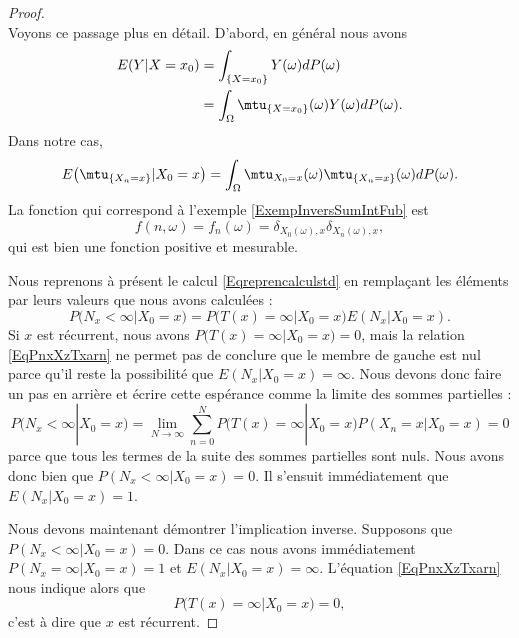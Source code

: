 \begin{proof}
\begin{subequations}
    \end{subequations}
    Voyons ce passage plus en détail. D'abord, en général nous avons
    \begin{subequations}
        \begin{align}
            E(Y|X=x_0)&=\int_{\{ X=x_0 \}}Y(\omega)dP(\omega)\\
            &=\int_{\Omega}\mtu_{\{ X=x_0 \}}(\omega)Y(\omega)dP(\omega).
        \end{align}
    \end{subequations}
    Dans notre cas,
    \begin{equation}
        E\big( \mtu_{\{ X_n=x \}}|X_0=x \big)=\int_{\Omega}\mtu_{X_0=x}(\omega)\mtu_{\{ X_n=x \}}(\omega)dP(\omega).
    \end{equation}
    La fonction qui correspond à l'exemple \ref{ExempInversSumIntFub} est
    \begin{equation}
        f(n,\omega)=f_n(\omega)=\delta_{X_0(\omega),x}\delta_{X_n(\omega),x},
    \end{equation}
    qui est bien une fonction positive et mesurable.

    Nous reprenons à présent le calcul \eqref{Eqreprencalculstd} en remplaçant les éléments par leurs valeurs que nous avons calculées :
    \begin{equation}    \label{EqPnxXzTxarn}
        P(N_x<\infty|X_0=x)=P\big(T(x)=\infty|X_0=x\big)E(N_x|X_0=x).
    \end{equation}
    Si \( x\) est récurrent, nous avons \( P\big( T(x)=\infty|X_0=x \big)=0\), mais la relation \eqref{EqPnxXzTxarn} ne permet pas de conclure que le membre de gauche est nul parce qu'il reste la possibilité que \( E(N_x|X_0=x)=\infty\). Nous devons donc faire un pas en arrière et écrire cette espérance comme la limite des sommes partielles :
    \begin{equation}
        P(N_x<\infty|X_0=x)=\lim_{N\to \infty} \sum_{n=0}^NP\big( T(x)=\infty|X_0=x \big)P(X_n=x|X_0=x)=0
    \end{equation}
    parce que tous les termes de la suite des sommes partielles sont nuls. Nous avons donc bien que \( P(N_x<\infty|X_0=x)=0\). Il s'ensuit immédiatement que \( E(N_x|X_0=x)=1\).

    Nous devons maintenant démontrer l'implication inverse. Supposons que \( P(N_x<\infty|X_0=x)=0\). Dans ce cas nous avons immédiatement \( P(N_x=\infty|X_0=x)=1\) et \( E(N_x|X_0=x)=\infty\). L'équation \eqref{EqPnxXzTxarn} nous indique alors que 
    \begin{equation}
        P\big( T(x)=\infty|X_0=x \big)=0,
    \end{equation}
    c'est à dire que \( x\) est récurrent.
\end{proof}

